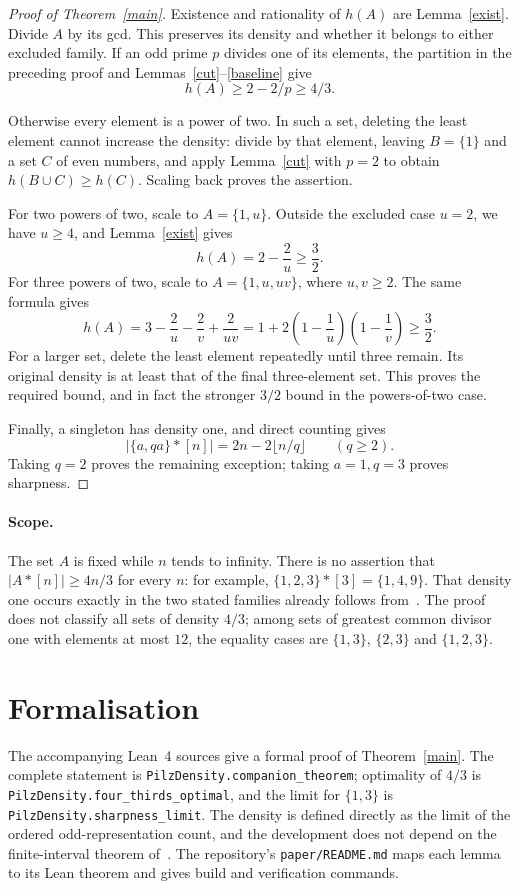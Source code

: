 \documentclass[11pt]{article}
\begin{document}
\begin{proof}[Proof of Theorem~\ref{main}]
Existence and rationality of \(h(A)\) are Lemma~\ref{exist}.
Divide \(A\) by its gcd. This preserves its density and whether it belongs
to either excluded family. If an odd prime \(p\) divides one of its elements,
the partition in the preceding proof and Lemmas~\ref{cut}--\ref{baseline} give
\[
h(A)\ge2-2/p\ge4/3.
\]

Otherwise every element is a power of two. In such a set, deleting the least
element cannot increase the density: divide by that element, leaving
\(B=\{1\}\) and a set \(C\) of even numbers, and apply Lemma~\ref{cut} with
\(p=2\) to obtain \(h(B\cup C)\ge h(C)\). Scaling back proves the assertion.

For two powers of two, scale to \(A=\{1,u\}\). Outside the excluded case
\(u=2\), we have \(u\ge4\), and Lemma~\ref{exist} gives
\[
h(A)=2-\frac2u\ge\frac32.
\]
For three powers of two, scale to \(A=\{1,u,uv\}\), where \(u,v\ge2\).
The same formula gives
\[
h(A)=3-\frac2u-\frac2v+\frac2{uv}
=1+2\left(1-\frac1u\right)\left(1-\frac1v\right)\ge\frac32.
\]
For a larger set, delete the least element repeatedly until three remain.
Its original density is at least that of the final three-element set.
This proves the required bound, and in fact the stronger \(3/2\) bound
in the powers-of-two case.

Finally, a singleton has density one, and direct counting gives
\[
|\{a,qa\}*[n]|=2n-2\lfloor n/q\rfloor\qquad(q\ge2).
\]
Taking \(q=2\) proves the remaining exception; taking \(a=1,q=3\)
proves sharpness.
\end{proof}

\paragraph{Scope.}
The set \(A\) is fixed while \(n\) tends to infinity.
There is no assertion that \(|A*[n]|\ge4n/3\) for every \(n\):
for example, \(\{1,2,3\}*[3]=\{1,4,9\}\).
That density one occurs exactly in the two stated families already
follows from~\cite[Theorem 1.8]{HP}. The proof does not classify all sets
of density \(4/3\); among sets of greatest common divisor one with elements
at most \(12\), the equality cases are \(\{1,3\}\), \(\{2,3\}\) and
\(\{1,2,3\}\).

\section*{Formalisation}
The accompanying Lean~4 sources give a formal proof of Theorem~\ref{main}.
The complete statement is \texttt{PilzDensity.companion\_theorem}; optimality
of \(4/3\) is \texttt{PilzDensity.four\_thirds\_optimal}, and the limit for
\(\{1,3\}\) is \texttt{PilzDensity.sharpness\_limit}. The density is defined
directly as the limit of the ordered odd-representation count, and the
development does not depend on the finite-interval theorem of~\cite{Main}.
The repository's \texttt{paper/README.md} maps each lemma to its Lean
theorem and gives build and verification commands.
\end{document}
